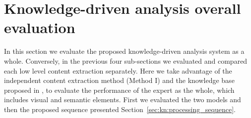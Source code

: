 





\section{Knowledge-driven analysis overall evaluation} %
\label{sub:ex:knowledge_driven_analysis_evaluation}

In this section we evaluate the proposed knowledge-driven analysis system as a whole.
Conversely, in the previous four sub-sections we evaluated and compared each low level content extraction separately.
Here we take advantage of the independent content extraction method (Method I) and the knowledge base proposed in , to evaluate the performance of the expert as the whole, which includes visual and semantic elements.
First we evaluated the two models and then the proposed sequence presented Section~\ref{sec:kn:processing_sequence}.


